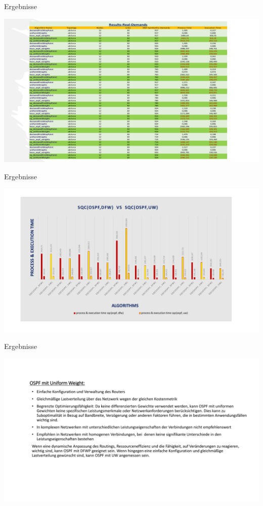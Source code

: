 \documentclass[aspectratio=169,10pt]{beamer}
\begin{document}
\begin{frame}{Ergebnisse}
\begin{center}
    \includegraphics[width=\textwidth]{images/naveed_13.pdf}
\end{center}
\end{frame}
\begin{frame}{Ergebnisse}
\begin{center}
    \includegraphics[width=\textwidth]{images/naveed_14.pdf}
\end{center}
\end{frame}
\begin{frame}{Ergebnisse}
\begin{center}
    \includegraphics[width=\textwidth]{images/naveed_15.pdf}
\end{center}
\end{frame}
\end{document}
